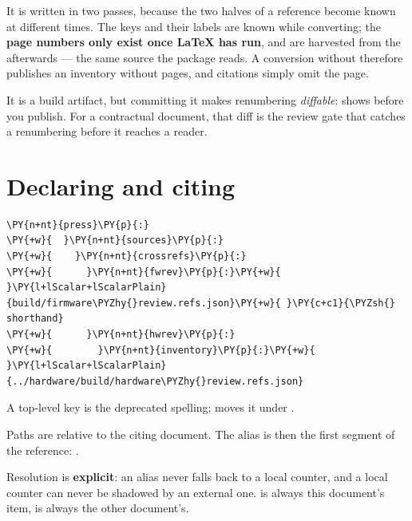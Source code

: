 \documentclass[a4paper,twoside]{article}
\begin{document}
It is written in two passes, because the two halves of a reference become known
at different times. The keys and their labels are known while converting; the
\textbf{page numbers only exist once \LaTeX{} has run}, and are harvested from the
 afterwards --- the same source the  package reads. A conversion without
 therefore publishes an inventory without pages, and citations simply
omit the page.
\begin{tscallout}[kind=tip, title={Commit the inventory}]
It is a build artifact, but committing it makes renumbering \emph{diffable}:
 shows  before you publish. For a contractual
document, that diff is the review gate that catches a renumbering before it
reaches a reader.
\end{tscallout}
\section{Declaring and citing}
\begin{tscode}[lang=yaml, engine=pygments]
\begin{Verbatim}[commandchars=\\\{\},breaklines, breakanywhere, commandchars=\\\{\}]
\PY{n+nt}{press}\PY{p}{:}
\PY{+w}{  }\PY{n+nt}{sources}\PY{p}{:}
\PY{+w}{    }\PY{n+nt}{crossrefs}\PY{p}{:}
\PY{+w}{      }\PY{n+nt}{fwrev}\PY{p}{:}\PY{+w}{ }\PY{l+lScalar+lScalarPlain}{build/firmware\PYZhy{}review.refs.json}\PY{+w}{ }\PY{c+c1}{\PYZsh{} shorthand}
\PY{+w}{      }\PY{n+nt}{hwrev}\PY{p}{:}
\PY{+w}{        }\PY{n+nt}{inventory}\PY{p}{:}\PY{+w}{ }\PY{l+lScalar+lScalarPlain}{../hardware/build/hardware\PYZhy{}review.refs.json}
\end{Verbatim}
\end{tscode}
A top-level  key is the deprecated spelling; 
moves it under .

Paths are relative to the citing document. The alias is then the first segment
of the reference: .

Resolution is \textbf{explicit}: an alias never falls back to a local counter, and a
local counter can never be shadowed by an external one.  is always this
document's item,  is always the other document's.
\end{document}
